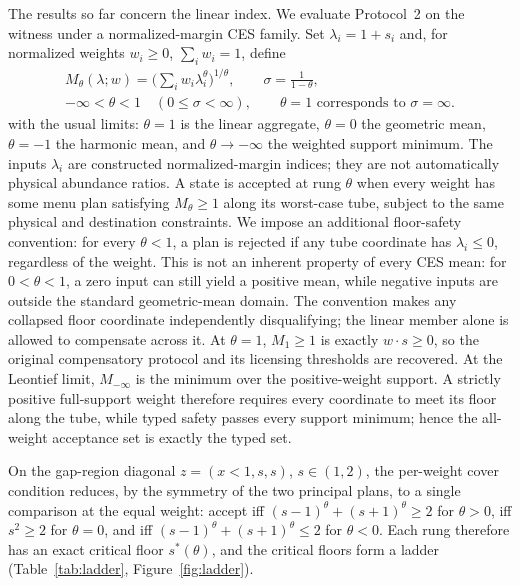 \documentclass[preprint,11pt,authoryear]{elsarticle}
\theoremstyle{definition}
\theoremstyle{remark}
\begin{document}
The results so far concern the linear index. We evaluate Protocol~2 on the witness under a normalized-margin CES family. Set $\lambda_i=1+s_i$ and, for normalized weights $w_i\ge0$, $\sum_iw_i=1$, define
\[
\begin{gathered}
M_\theta(\lambda;w)=\Big(\sum_iw_i\lambda_i^\theta\Big)^{1/\theta},\qquad \sigma=\frac1{1-\theta},\\
-\infty<\theta<1\quad(0\le\sigma<\infty),\qquad \theta=1\text{ corresponds to }\sigma=\infty.
\end{gathered}
\]
with the usual limits: $\theta=1$ is the linear aggregate, $\theta=0$ the geometric mean, $\theta=-1$ the harmonic mean, and $\theta\to-\infty$ the weighted support minimum. The inputs $\lambda_i$ are constructed normalized-margin indices; they are not automatically physical abundance ratios. A state is accepted at rung $\theta$ when every weight has some menu plan satisfying $M_\theta\ge1$ along its worst-case tube, subject to the same physical and destination constraints. We impose an additional floor-safety convention: for every $\theta<1$, a plan is rejected if any tube coordinate has $\lambda_i\le0$, regardless of the weight. This is not an inherent property of every CES mean: for $0<\theta<1$, a zero input can still yield a positive mean, while negative inputs are outside the standard geometric-mean domain. The convention makes any collapsed floor coordinate independently disqualifying; the linear member alone is allowed to compensate across it. At $\theta=1$, $M_1\ge1$ is exactly $w\cdot s\ge0$, so the original compensatory protocol and its licensing thresholds are recovered. At the Leontief limit, $M_{-\infty}$ is the minimum over the positive-weight support. A strictly positive full-support weight therefore requires every coordinate to meet its floor along the tube, while typed safety passes every support minimum; hence the all-weight acceptance set is exactly the typed set.

On the gap-region diagonal $z=(x<1,s,s)$, $s\in(1,2)$, the per-weight cover condition reduces, by the symmetry of the two principal plans, to a single comparison at the equal weight: accept iff $(s-1)^\theta+(s+1)^\theta\ge2$ for $\theta>0$, iff $s^2\ge2$ for $\theta=0$, and iff $(s-1)^\theta+(s+1)^\theta\le2$ for $\theta<0$. Each rung therefore has an exact critical floor $s^*(\theta)$, and the critical floors form a ladder (Table~\ref{tab:ladder}, Figure~\ref{fig:ladder}).
\end{document}
